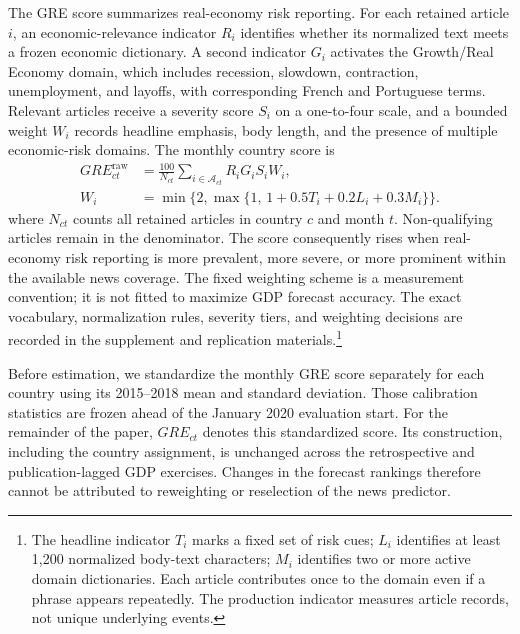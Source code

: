 \documentclass[preprint,12pt,authoryear]{elsarticle}
\begin{document}
The GRE score summarizes real-economy risk reporting. For each retained article $i$, an economic-relevance indicator $R_i$ identifies whether its normalized text meets a frozen economic dictionary. A second indicator $G_i$ activates the Growth/Real Economy domain, which includes recession, slowdown, contraction, unemployment, and layoffs, with corresponding French and Portuguese terms. Relevant articles receive a severity score $S_i$ on a one-to-four scale, and a bounded weight $W_i$ records headline emphasis, body length, and the presence of multiple economic-risk domains. The monthly country score is
\begin{equation}
\begin{aligned}
GRE_{ct}^{\mathrm{raw}}&=\frac{100}{N_{ct}}\sum_{i\in\mathcal A_{ct}} R_iG_iS_iW_i,\\
W_i&=\min\!\bigl\{2,\max\{1,\,1+0.5T_i+0.2L_i+0.3M_i\}\bigr\}.
\end{aligned}
\label{eq:gre_construction}
\end{equation}
where $N_{ct}$ counts all retained articles in country $c$ and month $t$. Non-qualifying articles remain in the denominator. The score consequently rises when real-economy risk reporting is more prevalent, more severe, or more prominent within the available news coverage. The fixed weighting scheme is a measurement convention; it is not fitted to maximize GDP forecast accuracy. The exact vocabulary, normalization rules, severity tiers, and weighting decisions are recorded in the supplement and replication materials.\footnote{The headline indicator $T_i$ marks a fixed set of risk cues; $L_i$ identifies at least 1,200 normalized body-text characters; $M_i$ identifies two or more active domain dictionaries. Each article contributes once to the domain even if a phrase appears repeatedly. The production indicator measures article records, not unique underlying events.}



Before estimation, we standardize the monthly GRE score separately for each country using its 2015--2018 mean and standard deviation. Those calibration statistics are frozen ahead of the January 2020 evaluation start. For the remainder of the paper, $GRE_{ct}$ denotes this standardized score. Its construction, including the country assignment, is unchanged across the retrospective and publication-lagged GDP exercises. Changes in the forecast rankings therefore cannot be attributed to reweighting or reselection of the news predictor.
\end{document}
